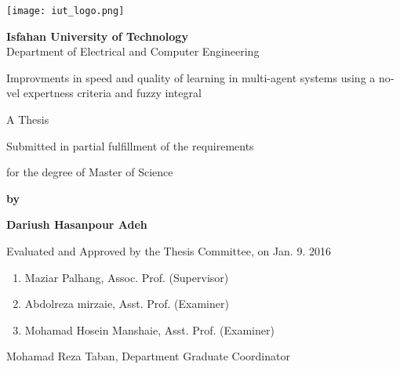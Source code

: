 \thispagestyle{empty}
\begin{latin}
\begin{center}
\texttt{[image: iut\_logo.png]}
\vspace{0.4cm}

{\large\textbf{Isfahan University of Technology}}\\

\vspace{0.4cm}
Department of Electrical and Computer Engineering

\vspace{2.5cm}

{\Huge Improvments in speed and quality of learning in multi-agent systems using a novel expertness criteria and fuzzy integral}

\vspace{1.5cm}

{\large
	A Thesis
	
	\vspace{.3cm}
	
	Submitted in partial fulfillment of the requirements
	
	\vspace{.3cm}
	
	for the degree of Master of Science
}

	\vspace{1.5cm}

{\Large
	\textbf{by}
	
	\vspace{.3cm}
	
	\textbf{Dariush Hasanpour Adeh}
}
\end{center}

\vfill

Evaluated and Approved by the Thesis Committee, on Jan. 9. 2016
\vspace{0.5cm}

\begin{enumerate}
\item Maziar Palhang, Assoc. Prof. (Supervisor)
\vspace{0.5cm}

\item Abdolreza mirzaie, Asst. Prof. (Examiner)
\vspace{0.5cm}

\item Mohamad Hosein Manshaie, Asst. Prof. (Examiner)
\vspace{0.5cm}

\end{enumerate}

Mohamad Reza Taban, Department Graduate Coordinator

\pagebreak
\end{latin}

\thispagestyle{empty}
\mbox{}

